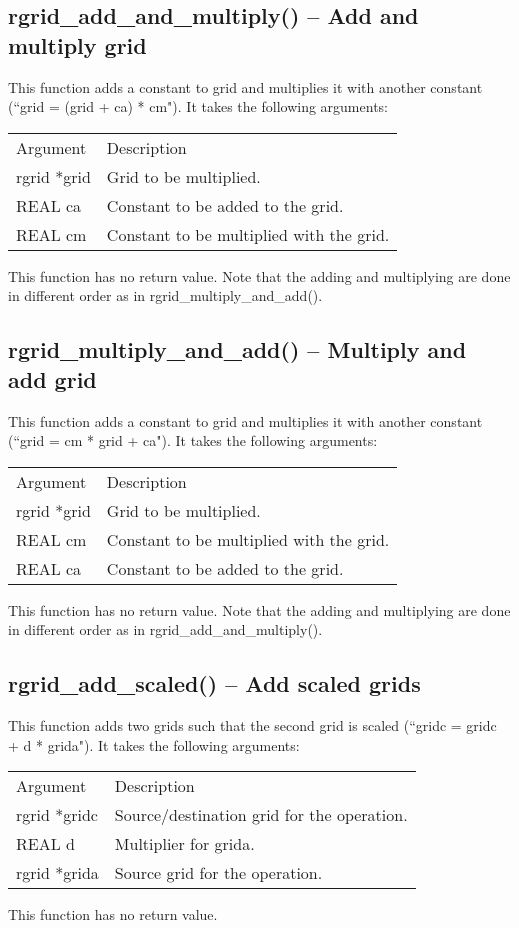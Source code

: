 \documentclass[12pt,letterpaper]{report}
\begin{document}
\subsection{rgrid\_add\_and\_multiply() -- Add and multiply grid}

This function adds a constant to grid and multiplies it with another constant (``grid = (grid + ca) * cm"). It takes the following arguments:
\begin{longtable}{p{} p{}}
Argument & Description\\
\cline{1-2}
rgrid *grid & Grid to be multiplied.\\
REAL ca & Constant to be added to the grid.\\
REAL cm & Constant to be multiplied with the grid.\\
\end{longtable}
\noindent
This function has no return value. Note that the adding and multiplying are done in different order as in rgrid\_multiply\_and\_add().

\subsection{rgrid\_multiply\_and\_add() -- Multiply and add grid}

This function adds a constant to grid and multiplies it with another constant (``grid = cm * grid + ca"). It takes the following arguments:
\begin{longtable}{p{} p{}}
Argument & Description\\
\cline{1-2}
rgrid *grid & Grid to be multiplied.\\
REAL cm & Constant to be multiplied with the grid.\\
REAL ca & Constant to be added to the grid.\\
\end{longtable}
\noindent
This function has no return value. Note that the adding and multiplying are done in different order as in rgrid\_add\_and\_multiply().

\subsection{rgrid\_add\_scaled() -- Add scaled grids}

This function adds two grids such that the second grid is scaled (``gridc = gridc + d * grida"). It takes the following arguments:
\begin{longtable}{p{} p{}}
Argument & Description\\
\cline{1-2}
rgrid *gridc & Source/destination grid for the operation.\\
REAL d & Multiplier for grida.\\
rgrid *grida & Source grid for the operation.\\
\end{longtable}
\noindent
This function has no return value.
\end{document}
